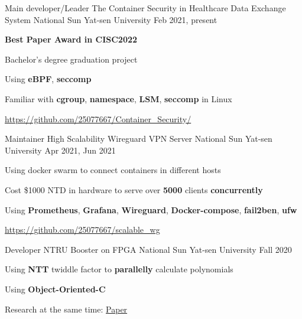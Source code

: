 \begin{cventries}
    \cventry
    {Main developer/Leader}
    {The Container Security in Healthcare Data Exchange System}
    {National Sun Yat-sen University} %
    {Feb 2021, present} %
    {
        \begin{cvitems} %
            \item {\textbf{Best Paper Award in CISC2022}}
            \item {Bachelor's degree graduation project}
			\item {Using \textbf{eBPF}, \textbf{seccomp}}
			\item {Familiar with \textbf{cgroup}, \textbf{namespace}, \textbf{LSM}, \textbf{seccomp} in Linux}
            \item {\url{https://github.com/25077667/Container_Security/}}
        \end{cvitems}
    }

    \cventry
    {Maintainer}
    {High Scalability Wireguard VPN Server}
    {National Sun Yat-sen University} %
    {Apr 2021, Jun 2021} %
    {
        \begin{cvitems} %
    		\item {Using docker swarm to connect containers in different hosts}
		    \item {Cost \$1000 NTD in hardware to serve over \textbf{5000} clients \textbf{concurrently}}
    		\item {Using \textbf{Prometheus}, \textbf{Grafana}, \textbf{Wireguard}, \textbf{Docker-compose}, \textbf{fail2ben}, \textbf{ufw}}
            \item {\url{https://github.com/25077667/scalable_wg}}
        \end{cvitems}
    }

    \cventry
    {Developer}
    {NTRU Booster on FPGA}
    {National Sun Yat-sen University} %
    {Fall 2020} %
    {
        \begin{cvitems} %
    		\item {Using \textbf{NTT} twiddle factor to \textbf{parallelly} calculate polynomials}
			\item{Using \textbf{Object-Oriented-C}}
            \item {Research at the same time: \href{http://dx.doi.org/10.6342/NTU202003012}{Paper}}
        \end{cvitems}
    }
\end{cventries}
